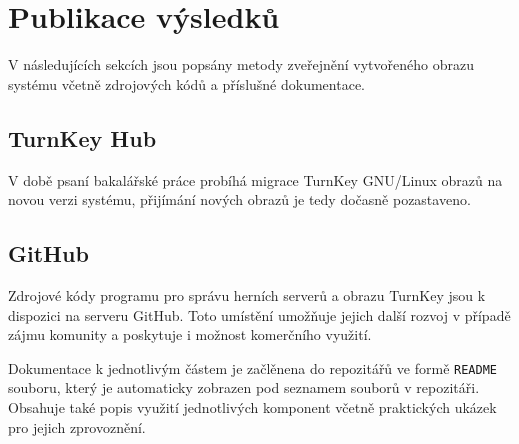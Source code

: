 \chapter{Publikace výsledků}

V následujících sekcích jsou popsány metody zveřejnění vytvořeného obrazu systému včetně zdrojových kódů
a příslušné dokumentace.

\section{TurnKey Hub}

V době psaní bakalářské práce probíhá migrace TurnKey GNU/Linux obrazů na novou verzi systému, přijímání nových obrazů je tedy dočasně pozastaveno.

\section{GitHub}

Zdrojové kódy programu pro správu herních serverů \cite{github_linux_gameservers} a obrazu TurnKey \cite{github_turnkey_gameserver}
jsou k dispozici na serveru GitHub. Toto umístění umožňuje jejich další rozvoj v případě zájmu komunity a poskytuje i
možnost komerčního využití.

Dokumentace k jednotlivým částem je začlěnena do repozitářů ve formě \texttt{README} souboru, který je automaticky zobrazen
pod seznamem souborů v repozitáři. Obsahuje také popis využití jednotlivých komponent včetně praktických ukázek pro jejich zprovoznění.